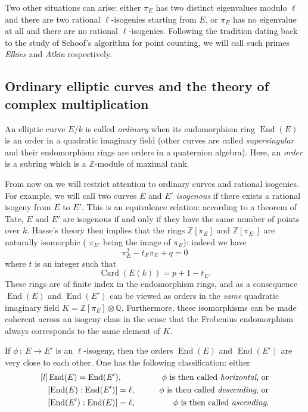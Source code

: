 \documentclass{article}
\newcommand{\Q}{\mathbb{Q}}
\newcommand{\Z}{\mathbb{Z}}
\newcommand{\from}{\ensuremath{\,:\ }}
\DeclareMathOperator{\End}{End}
\DeclareMathOperator{\Card}{Card}
\begin{document}
Two other situations can arise: either $\pi_E$ has two distinct eigenvalues 
modulo $\ell$ and there are two rational $\ell$-isogenies starting from $E$, or 
$\pi_E$ has no eigenvalue at all and there are no rational $\ell$-isogenies. 
Following the tradition dating back to the study of Schoof's algorithm for 
point counting, we will call such primes \emph{Elkies} and \emph{Atkin} 
respectively.



\subsection{Ordinary elliptic curves and the theory of complex multiplication}

An elliptic curve $E/k$ is called \emph{ordinary} when its endomorphism ring $
\End(E)$ is an order in a quadratic imaginary field (other curves are called 
\emph{supersingular} and their endomorphism rings are orders in a quaternion 
algebra). Here, an \emph{order} is a subring which is a $\Z$-module of maximal 
rank. 

From now on we will restrict attention to ordinary curves and rational 
isogenies. For example, we will call two curves $E$ and $E'$ \emph{isogenous} 
if there exists a rational isogeny from $E$ to $E'$. This is an equivalence 
relation: according to a theorem of Tate, $E$ and $E'$ are isogenous if and 
only if they have the same number of points over $k$. Hasse's theory then 
implies that the rings $\Z[\pi_E]$ and $\Z[\pi_{E'}]$ are naturally isomorphic (
$\pi_{E'}$ being the image of $\pi_{E}$): indeed we have
\[
\pi_E^2 - t_E\pi_E + q = 0
\]
where $t$ is an integer such that
\[
\Card(E(k)) = p + 1 - t_E.
\]
These rings are of finite index in the endomorphism rings, and as a consequence 
$\End(E)$ and $\End(E')$ can be viewed as orders in the \emph{same} quadratic 
imaginary field $K = \Z[\pi_E]\otimes\Q$. Furthermore, these isomorphisms can 
be made coherent across an isogeny class in the sense that the Frobenius 
endomorphism always corresponds to the same element of $K$.

If $\phi\from E\to E'$ is an $\ell$-isogeny, then the orders $\End(E)$ and $\End
(E')$ are very close to each other. One has the following classification: either
\[
\begin{aligned}[l]
&\End(E) = \End(E'),
&\qquad\text{$\phi$ is then called \emph{horizontal}, or} &\\
&[\End(E):\End(E')] = \ell,
&\qquad\text{$\phi$ is then called \emph{descending}, or} &\\
&[\End(E'):\End(E)] = \ell,
&\qquad\text{$\phi$ is then called \emph{ascending}.} &
\end{aligned}
\]
\end{document}
